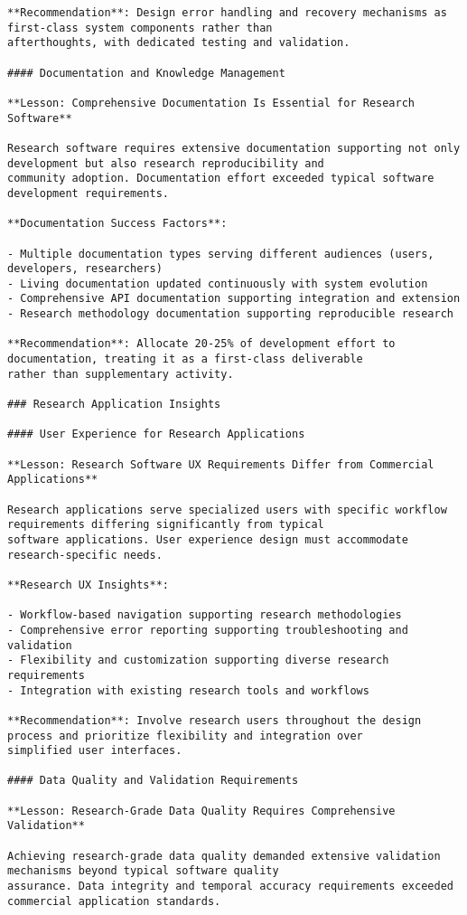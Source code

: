 \documentclass[12pt,a4paper]{report}
\begin{document}
\begin{verbatim}
**Recommendation**: Design error handling and recovery mechanisms as first-class system components rather than
afterthoughts, with dedicated testing and validation.

#### Documentation and Knowledge Management

**Lesson: Comprehensive Documentation Is Essential for Research Software**

Research software requires extensive documentation supporting not only development but also research reproducibility and
community adoption. Documentation effort exceeded typical software development requirements.

**Documentation Success Factors**:

- Multiple documentation types serving different audiences (users, developers, researchers)
- Living documentation updated continuously with system evolution
- Comprehensive API documentation supporting integration and extension
- Research methodology documentation supporting reproducible research

**Recommendation**: Allocate 20-25% of development effort to documentation, treating it as a first-class deliverable
rather than supplementary activity.

### Research Application Insights

#### User Experience for Research Applications

**Lesson: Research Software UX Requirements Differ from Commercial Applications**

Research applications serve specialized users with specific workflow requirements differing significantly from typical
software applications. User experience design must accommodate research-specific needs.

**Research UX Insights**:

- Workflow-based navigation supporting research methodologies
- Comprehensive error reporting supporting troubleshooting and validation
- Flexibility and customization supporting diverse research requirements
- Integration with existing research tools and workflows

**Recommendation**: Involve research users throughout the design process and prioritize flexibility and integration over
simplified user interfaces.

#### Data Quality and Validation Requirements

**Lesson: Research-Grade Data Quality Requires Comprehensive Validation**

Achieving research-grade data quality demanded extensive validation mechanisms beyond typical software quality
assurance. Data integrity and temporal accuracy requirements exceeded commercial application standards.


\end{verbatim}
\end{document}
